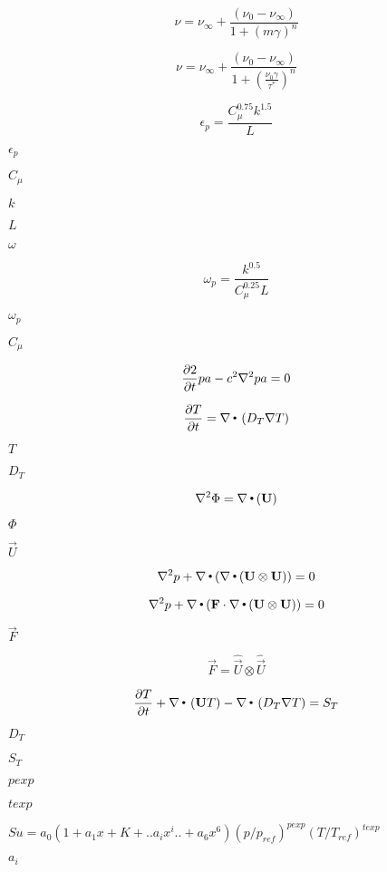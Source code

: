 \documentclass{article}
\begin{document}
\[
    \nu = \nu_\infty + \frac{(\nu_0 - \nu_\infty)}{1 + (m\gamma)^n}
\]
\pagebreak

\[
    \nu = \nu_\infty
        + \frac{(\nu_0 - \nu_\infty)}
               {1 + \left(\frac{\nu_0\gamma}{\tau^*}\right)^n}
\]
\pagebreak

\[
        \epsilon_p = \frac{C_{\mu}^{0.75} k^{1.5}}{L}
    \]
\pagebreak

$      \epsilon_p $
\pagebreak

$      C_\mu      $
\pagebreak

$      k          $
\pagebreak

$      L          $
\pagebreak

$\omega$
\pagebreak

\[
        \omega_p = \frac{k^{0.5}}{C_{\mu}^{0.25} L}
    \]
\pagebreak

$        \omega_p $
\pagebreak

$        C_{\mu} $
\pagebreak

\[
    \frac{\partial 2}{\partial t }{pa} - c^2 \nabla^{2}{pa} = 0
\]
\pagebreak

\[
    \frac{\partial T}{\partial t }  = \nabla\,{\scriptscriptstyle \stackrel{\bullet}{{}}}\, \left( D_T \nabla T \right)
\]
\pagebreak

$        T     $
\pagebreak

$        D_T   $
\pagebreak

\[
    \nabla^{2} \Phi = \nabla\,{\scriptscriptstyle \stackrel{\bullet}{{}}}\,(\mathbf U)
\]
\pagebreak

$        \Phi      $
\pagebreak

$        \vec{U}   $
\pagebreak

\[
        \nabla^{2} p + \nabla\,{\scriptscriptstyle \stackrel{\bullet}{{}}}\,(\nabla\,{\scriptscriptstyle \stackrel{\bullet}{{}}}\,(\mathbf U\otimes\mathbf U)) = 0
    \]
\pagebreak

\[
        \nabla^{2} p + \nabla\,{\scriptscriptstyle \stackrel{\bullet}{{}}}\,(\mathbf F\cdot\nabla\,{\scriptscriptstyle \stackrel{\bullet}{{}}}\,(\mathbf U\otimes\mathbf U)) = 0
    \]
\pagebreak

$\vec{F}$
\pagebreak

\[
        \vec{F} = \hat{\vec{U}}\otimes\hat{\vec{U}}
    \]
\pagebreak

\[
    \frac{\partial T}{\partial t } + \nabla\,{\scriptscriptstyle \stackrel{\bullet}{{}}}\, \left(\mathbf U T\right) - \nabla\,{\scriptscriptstyle \stackrel{\bullet}{{}}}\, \left(D_T \nabla T \right)
    = S_{T}
\]
\pagebreak

$        D_T     $
\pagebreak

$        S_T     $
\pagebreak

$ pexp $
\pagebreak

$ texp $
\pagebreak

$ Su = a_{0}(1+a_{1}x+K+..a_{i}x^{i}..+a_{6}x^{6}) (p/p_{ref})^{pexp}
(T/T_{ref})^{texp} $
\pagebreak

$ a_{i} $
\pagebreak
\end{document}
